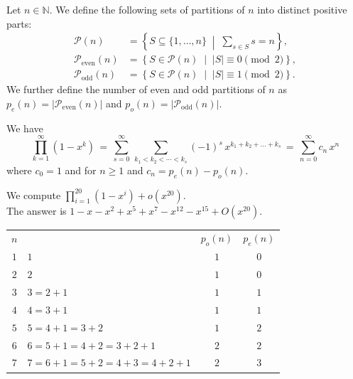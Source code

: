 \begin{definition} \leanok

Let $n \in \mathbb{N}$. We define the following sets of partitions of $n$ into distinct positive parts:
\begin{align*}
\mathcal{P}(n) &= \left\{ S \subseteq \{1, \ldots, n\} \;\middle|\; \sum_{s \in S} s = n \right\}, \\
\mathcal{P}_{\mathrm{even}}(n) &= \left\{ S \in \mathcal{P}(n) \;\middle|\; |S| \equiv 0 \pmod{2} \right\}, \\
\mathcal{P}_{\mathrm{odd}}(n) &= \left\{ S \in \mathcal{P}(n) \;\middle|\; |S| \equiv 1 \pmod{2} \right\}.
\end{align*}
We further define the number of even and odd partitions of $n$ as $p_e(n) = |\mathcal{P}_{\mathrm{even}}(n)|$ and $p_o(n) = |\mathcal{P}_{\mathrm{odd}}(n)|$.
\end{definition}


\begin{lemma}
We have
$$\prod_{k=1}^{\infty}(1-x^k)\,=\,\sum_{s=0}^\infty\,\sum_{k_1<k_2<\cdots<k_s}(-1)^s\,x^{k_1+k_2+\ldots+k_s}\,=\,\sum_{n=0}^\infty c_n\, x^n$$
where $c_0=1$ and for $n\geq 1$ and $c_n=p_e(n)-p_o(n).$
\end{lemma}

\begin{example}
We compute $\prod_{i=1}^{20}(1 - x^i) + o(x^{20}).$\\

The answer is $1-x-x^2+x^5+x^7-x^{12}-x^{15}+O\left(x^{20}\right).$\\

\begin{center}
\begin{tabular}{c|l|c|c}
$n$ && $p_o(n)$ & $p_e(n)$\\
$1$&$1$&$1$&$0$\\
$2$&$2$&$1$&$0$\\
$3$&$3=2+1$&$1$&$1$\\
$4$&$4=3+1$&$1$&$1$\\
$5$&$5=4+1=3+2$&$1$&$2$\\
$6$&$6=5+1=4+2=3+2+1$&$2$&$2$\\
$7$&$7=6+1=5+2=4+3=4+2+1$&$2$&$3$\\
\end{tabular}
\end{center}

\end{example}

